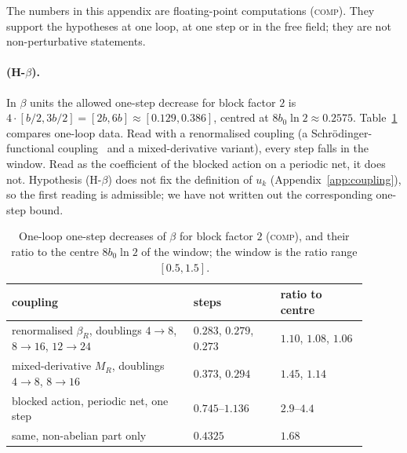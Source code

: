 \documentclass[11pt,a4paper]{article}
\theoremstyle{definition}
\theoremstyle{remark}
\newcommand{\tagC}{\textsc{comp}}
\begin{document}
The numbers in this appendix are floating-point computations (\tagC). They support the hypotheses at one loop, at one step or in the free field; they are not non-perturbative statements.

\paragraph{(H-$\beta$).} In $\beta$ units the allowed one-step decrease for block factor $2$ is $4\cdot[b/2,3b/2]=[2b,6b]\approx[0.129,0.386]$, centred at $8b_0\ln2\approx0.2575$. Table~\ref{tab:hbeta} compares one-loop data. Read with a renormalised coupling (a Schrödinger-functional coupling~\cite{LNWW} and a mixed-derivative variant), every step falls in the window. Read as the coefficient of the blocked action on a periodic net, it does not. Hypothesis (H-$\beta$) does not fix the definition of $u_k$ (Appendix~\ref{app:coupling}), so the first reading is admissible; we have not written out the corresponding one-step bound.

\begin{table}[ht]\centering\small
\caption{One-loop one-step decreases of $\beta$ for block factor $2$ (\tagC), and their ratio to the centre $8b_0\ln2$ of the window; the window is the ratio range $[0.5,1.5]$.}\label{tab:hbeta}
\begin{tabular}{@{}>{\raggedright\arraybackslash}p{0.46\linewidth}>{\raggedright\arraybackslash}p{0.22\linewidth}>{\raggedright\arraybackslash}p{0.22\linewidth}@{}}\toprule
coupling & steps & ratio to centre\\\midrule
renormalised $\beta_R$, doublings $4\to8$, $8\to16$, $12\to24$ & $0.283$, $0.279$, $0.273$ & $1.10$, $1.08$, $1.06$\\
mixed-derivative $M_R$, doublings $4\to8$, $8\to16$ & $0.373$, $0.294$ & $1.45$, $1.14$\\
blocked action, periodic net, one step & $0.745$--$1.136$ & $2.9$--$4.4$\\
same, non-abelian part only & $0.4325$ & $1.68$\\\bottomrule
\end{tabular}
\end{table}
\end{document}
